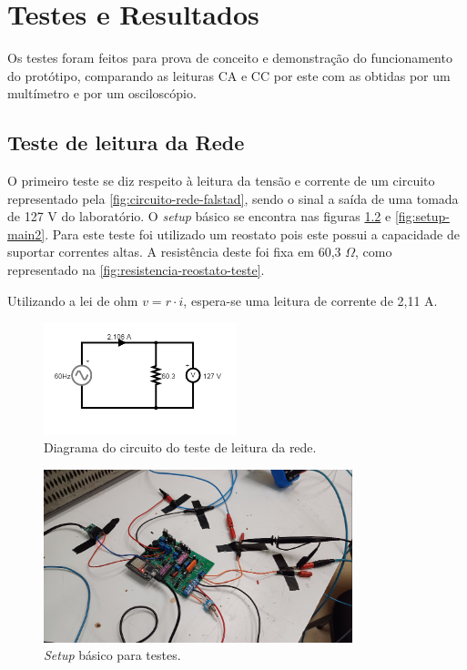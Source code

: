 
\chapter{Testes e Resultados}\label{cap:resultados}

Os testes foram feitos para prova de conceito e demonstração do funcionamento do protótipo, comparando as leituras \gls{CA} e \gls{CC} por este com as obtidas por um multímetro e por um osciloscópio.

\section{Teste de leitura da Rede}\label{sec:l-rede}

O primeiro teste se diz respeito à leitura da tensão e corrente de um circuito representado pela \autoref{fig:circuito-rede-falstad}, sendo o sinal a saída de uma tomada de 127 V do laboratório. O \textit{setup} básico se encontra nas figuras \ref{fig:setup-main} e \ref{fig:setup-main2}. Para este teste foi utilizado um reostato pois este possui a capacidade de suportar correntes altas. A resistência deste foi fixa em 60,3 $\Omega$, como representado na \autoref{fig:resistencia-reostato-teste}.

Utilizando a lei de ohm $v = r \cdot  i$, espera-se uma leitura de corrente de 2,11 A.

\begin{figure}[htb!]
    \caption{Diagrama do circuito do teste de leitura da rede.}
    \label{fig:circuito-rede-falstad}
    \includegraphics[width=0.5\textwidth]{figuras/circ-rede-falstad.png}
    \fonte{}
\end{figure}

\begin{figure}[htb!]
    \caption{\textit{Setup} básico para testes.}
    \label{fig:setup-main}
    \includegraphics[width=0.8\textwidth]{figuras/setup-basico.png}
    \fonte{}
\end{figure}

